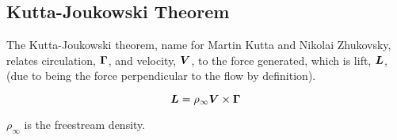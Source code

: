 \subsection{Kutta-Joukowski Theorem}

The Kutta-Joukowski theorem, name for Martin Kutta and Nikolai Zhukovsky, relates circulation, \(\bm{\Gamma}\), and velocity, \(\bm{V}\), to the force generated, which is lift, \(\bm{L}\), (due to being the force perpendicular to the flow by definition).

\begin{equation}
	\bm{L} = \rho_\infty \bm{V} \times \bm{\Gamma}
\end{equation}

\where \(\rho_\infty\) is the freestream density.
